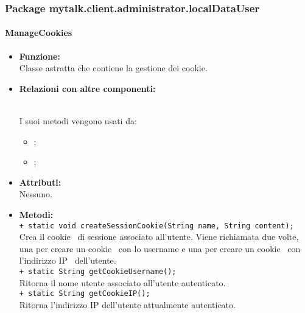 {\begin{sloppypar}
{{	\subsubsection{Package mytalk.client.administrator.localDataUser}{
		\paragraph{ManageCookies}\label{par:AManageCookies}{
				\begin{itemize}
					\item[] \textbf{Funzione:}{\\
						Classe astratta che contiene la gestione dei cookie\g.\\
					}
				
					\item[] \textbf{Relazioni con altre componenti:}{\\
						I suoi metodi vengono usati da:
						\begin{itemize}
							\item[] ;
							\item[] ;\\
						\end{itemize}
		
					}
					
				\item[] \textbf{Attributi:}{\\
					Nessuno.\\
					}
				
				\item[] \textbf{Metodi:}{ \\
					\texttt{+ static void createSessionCookie(String name, String content);}\\
					Crea il cookie\g~ di sessione associato all'utente. Viene richiamata due volte, una per creare un cookie\g~ con lo username e una per creare un cookie\g~ con l'indirizzo IP\g~ dell'utente.\\

					\texttt{+ static String getCookieUsername();}\\
					Ritorna il nome utente associato all'utente autenticato.\\
					
					\texttt{+ static String getCookieIP();}\\
					Ritorna l'indirizzo IP dell'utente attualmente autenticato.\\

}
\end{itemize}}}}}
\end{sloppypar}}
